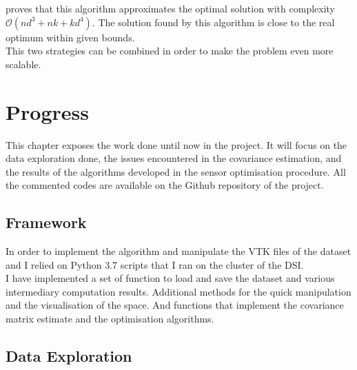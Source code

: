 \documentclass[12pt,twoside]{report}
\begin{document}
\citet{krause_near-optimal_2008} proves that this algorithm approximates the optimal solution with complexity $\mathcal{O}(nd^3 + nk + kd^4)$. The solution found by this algorithm is close to the real optimum within given bounds. \\

This two strategies can be combined in order to make the problem even more scalable. 


\chapter{Progress}

This chapter exposes the work done until now in the project. It will focus on the data exploration done, the issues encountered in the covariance estimation, and the results of the algorithms developed in the sensor optimisation procedure.  All the commented codes are available on the Github repository of the project. 


\section{Framework}

In order to implement the algorithm and manipulate the VTK files of the dataset and I relied on Python 3.7 scripts that I ran on the cluster of the DSI.  \\
 
 I have implemented a set of function to load and save the dataset and various intermediary computation results. Additional methods for the quick manipulation and the visualisation of the space. And functions that implement the covariance matrix estimate and the optimisation algorithms. 

\section{Data Exploration}
\end{document}
